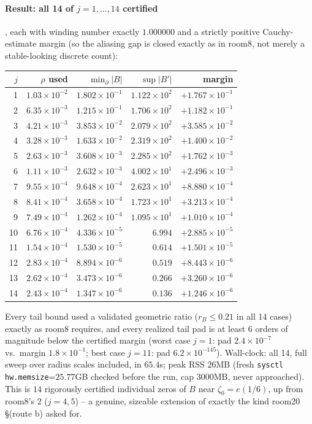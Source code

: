 \documentclass[11pt]{article}
\begin{document}
\paragraph{Result: all 14 of $j=1,\ldots,14$ certified}, each with winding number exactly $1.000000$
and a strictly positive Cauchy-estimate margin (so the aliasing gap is closed exactly as in room8,
not merely a stable-looking discrete count):
\begin{center}
{\small
\begin{tabular}{r r r r r}
\toprule
$j$ & $\rho$ used & $\min_{\partial}|B|$ & $\sup|B'|$ & margin \\
\midrule
1 & $1.03\times10^{-2}$ & $1.802\times10^{-1}$ & $1.122\times10^{2}$ & $+1.767\times10^{-1}$\\
2 & $6.35\times10^{-3}$ & $1.215\times10^{-1}$ & $1.706\times10^{2}$ & $+1.182\times10^{-1}$\\
3 & $4.21\times10^{-3}$ & $3.853\times10^{-2}$ & $2.079\times10^{2}$ & $+3.585\times10^{-2}$\\
4 & $3.28\times10^{-3}$ & $1.633\times10^{-2}$ & $2.319\times10^{2}$ & $+1.400\times10^{-2}$\\
5 & $2.63\times10^{-3}$ & $3.608\times10^{-3}$ & $2.285\times10^{2}$ & $+1.762\times10^{-3}$\\
6 & $1.11\times10^{-3}$ & $2.632\times10^{-3}$ & $4.002\times10^{1}$ & $+2.496\times10^{-3}$\\
7 & $9.55\times10^{-4}$ & $9.648\times10^{-4}$ & $2.623\times10^{1}$ & $+8.880\times10^{-4}$\\
8 & $8.41\times10^{-4}$ & $3.658\times10^{-4}$ & $1.723\times10^{1}$ & $+3.213\times10^{-4}$\\
9 & $7.49\times10^{-4}$ & $1.262\times10^{-4}$ & $1.095\times10^{1}$ & $+1.010\times10^{-4}$\\
10 & $6.76\times10^{-4}$ & $4.336\times10^{-5}$ & $6.994$ & $+2.885\times10^{-5}$\\
11 & $1.54\times10^{-4}$ & $1.530\times10^{-5}$ & $0.614$ & $+1.501\times10^{-5}$\\
12 & $2.83\times10^{-4}$ & $8.894\times10^{-6}$ & $0.519$ & $+8.443\times10^{-6}$\\
13 & $2.62\times10^{-4}$ & $3.473\times10^{-6}$ & $0.266$ & $+3.260\times10^{-6}$\\
14 & $2.43\times10^{-4}$ & $1.347\times10^{-6}$ & $0.136$ & $+1.246\times10^{-6}$\\
\bottomrule
\end{tabular}}
\end{center}
Every tail bound used a validated geometric ratio ($r_B\le0.21$ in all 14 cases) exactly as room8
requires, and every realized tail pad is at least 6 orders of magnitude below the certified margin
(worst case $j=1$: pad $2.4\times10^{-7}$ vs.\ margin $1.8\times10^{-1}$; best case $j=11$: pad
$6.2\times10^{-145}$). Wall-clock: all 14, full sweep over radius scales included, in $65.4$s;
peak RSS $26$MB (fresh \texttt{sysctl hw.memsize}=$25.77$GB checked before the run, cap $3000$MB,
never approached). This is $14$ rigorously certified individual zeros of $B$ near
$\zeta_0=e(1/6)$, up from room8's $2$ ($j=4,5$) -- a genuine, sizeable extension of exactly the kind
room20 \S(route b) asked for.
\end{document}
